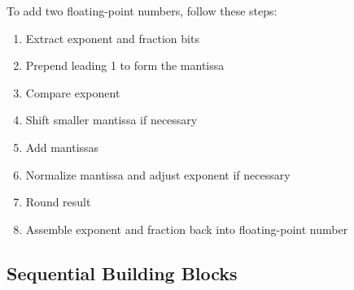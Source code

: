 \documentclass[12pt]{article}
\numberwithin{figure}{subsection}
\numberwithin{table}{subsection}
\numberwithin{equation}{subsection}
\begin{document}
\begin{enumerate}
  To add two floating-point numbers, follow these steps:

  \begin{enumerate}
    \item Extract exponent and fraction bits
    \item Prepend leading 1 to form the mantissa
    \item Compare exponent
    \item Shift smaller mantissa if necessary
    \item Add mantissas
    \item Normalize mantissa and adjust exponent if necessary
    \item Round result
    \item Assemble exponent and fraction back into floating-point number
  \end{enumerate}
\end{enumerate}

\subsection{Sequential Building Blocks}
\end{document}

